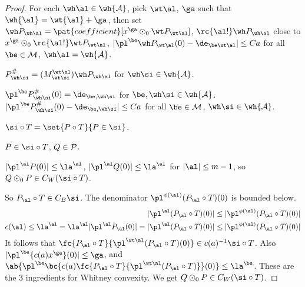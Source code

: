 \begin{proof}
For each $\wh \al \in \wh{\cal A}$, pick $\wt \al$, $\ga$ such that $\wh{\al}=\wt{\al}+\ga$, then set $\wh P_{\wh\al} = \pat{coefficient}[x^\ga \odot_0 \wt P_{\wt \al}]$, $\rc{\al!}\wh P_{\wh \al}$ close to $x^\ga \odot_0 \rc{\al!}\wt P_{\wt \al}$, 
$|\pl^\be \wh P_{\wt \al}(0) - \de_{\be\wt \al}|\le Ca$ for all $\be\in \cal M$, $\wh \al = \wh{\cal A}$.

$P^\#_{\wh \si} = (M_{\wt\si}^{\wt \al}) \wh P_{\wh \al}$ for $\wh \si\in \wh{\cal A}$. 



$\pl^\be P_{\wh \si}^\#(0) = \de_{\be,\wh \si}$ for $\be, \wh\si\in \wh{\cal A}$. 
$|\pl^\be P_{\wh \si}^\#(0) - \de_{\be, \wh \si}| \le Ca$ for all $\be\in \cal M$, $\wh\si\in \wh{\cal A}$. 

$\si\circ T = \set{P\circ T}{P\in \si}$. 

$P\in \si\circ T$, $Q\in \cal P$.

$|\pl^\al P(0)|\le \la^\al$, $|\pl^\al Q(0)|\le \la^\al$ for $|\al|\le m-1$, so $Q\odot_0 P\in C_W(\si\circ T)$.

So $P_\al\circ T\in C_B\si$. The denominator $\pl^{\phi(\al)}(P_\al\circ T)(0)$ is bounded below. 
\begin{align}
|\pl^\al(P_\al\circ T)(0)|
&\le |\pl^{\phi(\al)}(P_\al\circ T)(0)|\\
c(\al)\le 
\la^\al = 
\la^\al |\pl^\al P_\al(0)|=
|\pl^\al(P_\al\circ T)(0)|
&\le |\pl^{\phi(\al)}(P_\al\circ T)(0)|
\end{align}
It follows that
$\fc{P_\al\circ T}{\pl^{\wt \al}(P_\al\circ T)(0)}\in c(a)^{-1}\si\circ T$. %
Also $|\pl^\be \{c(a)x^\ga\}(0)|\le \ga$, and  $\ab{\pl^\be\bc{c(a)\fc{P_\al\circ T}{\pl^{\wt \al}(P_\al \circ T)}}(0)}\le \la^\be$. 
These are the 3 ingredients for Whitney convexity. 
We get $Q\odot_0 P \in C_W(\si\circ T)$.


\end{proof}
